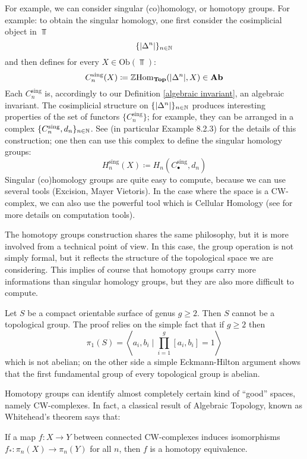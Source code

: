 \begin{refsection}
For example, we can consider singular (co)homology, or homotopy groups. For example: to obtain the singular homology, one first consider the cosimplicial object in $\Top$
\[
\{|\Delta^n|\}_{n \in \mathbb{N}}
\]
and then defines for every $X \in \mathrm{Ob}(\Top)$:
\[
C_n^{\mathrm{sing}}(X) \coloneqq \mathbb{Z} \mathrm{Hom}_{\mathbf{Top}}(|\Delta^n|,X) \in \mathbf{Ab}
\]
Each $C_n^{\mathrm{sing}}$ is, accordingly to our Definition \ref{algebraic invariant}, an algebraic invariant. The cosimplicial structure on $\{|\Delta^n|\}_{n \in \mathbb{N}}$ produces interesting properties of the set of functors $\{C_n^{\mathrm{sing}}\}$; for example, they can be arranged in a complex $\{C_n^{\mathrm{sing}},d_n\}_{n \in \mathbb{N}}$. See \cite[Ch. 8.2]{weibel} (in particular Example 8.2.3) for the details of this construction; one then can use this complex to define the singular homology groups:
\[
H_n^{\mathrm{sing}}(X)\coloneqq H_n(C_\bullet^{\mathrm{sing}},d_n)
\]
Singular (co)homology groups are quite easy to compute, because we can use several tools (Excision, Mayer Vietoris). In the case where the space is a CW-complex, we can also use the powerful tool which is Cellular Homology (see \cite[section~2.2]{hatcher-algebraic-topology} for more details on computation tools).

The homotopy groups construction shares the same philosophy, but it is more involved from a technical point of view. In this case, the group operation is not simply formal, but it reflects the structure of the topological space we are considering. This implies of course that homotopy groups carry more informations than singular homology groups, but they are also more difficult to compute.

\begin{eg}
Let $S$ be a compact orientable surface of genus $g \ge 2$. Then $S$ cannot be a topological group. The proof relies on the simple fact that if $g \ge 2$ then
\[
\pi_1(S) = \left\langle a_i,b_i \mid \prod_{i = 1}^g [a_i,b_i] = 1 \right\rangle
\]
which is not abelian; on the other side a simple Eckmann-Hilton argument shows that the first fundamental group of every topological group is abelian.
\end{eg}

Homotopy groups can identify almost completely certain kind of ``good'' spaces, namely CW-complexes. In fact, a classical result of Algebraic Topology, known as Whitehead's theorem says that:

\begin{thm} \label{thm concrete whitehead}
If a map $f \colon X \to Y$ between connected CW-complexes induces isomorphisms $f_* \colon \pi_n(X) \to \pi_n(Y)$ for all $n$, then $f$ is a homotopy equivalence.
\end{thm}


\end{refsection}
